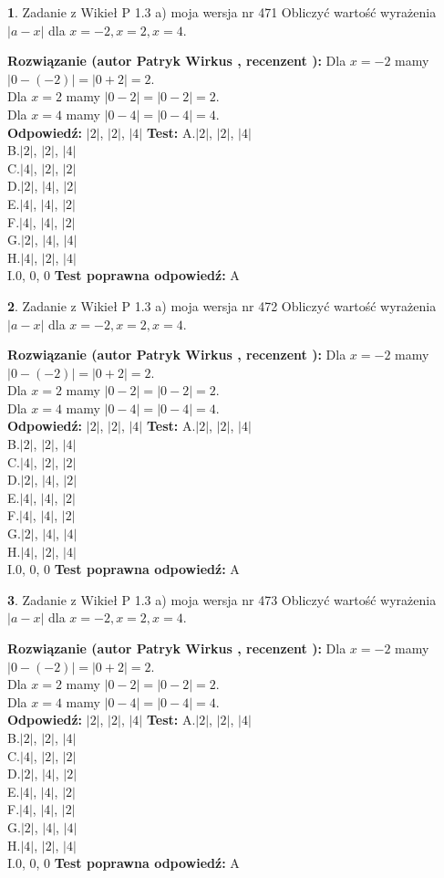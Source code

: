 \documentclass[12pt, a4paper]{article}
\theoremstyle{definition} %
\newtheorem{zad}{}
\newcommand{\zadStart}[1]{\begin{zad}#1\newline}
\newcommand{\zadStop}{\end{zad}}
\newcommand{\rozwStart}[2]{\noindent \textbf{Rozwiązanie (autor #1 , recenzent #2): }\newline}
\newcommand{\rozwStop}{\newline}
\newcommand{\odpStart}{\noindent \textbf{Odpowiedź:}\newline}
\newcommand{\odpStop}{\newline}
\newcommand{\testStart}{\noindent \textbf{Test:}\newline}
\newcommand{\testStop}{\newline}
\newcommand{\kluczStart}{\noindent \textbf{Test poprawna odpowiedź:}\newline}
\newcommand{\kluczStop}{\newline}
\begin{document}
\zadStart{Zadanie z Wikieł P 1.3 a) moja wersja nr 471}
Obliczyć wartość wyrażenia $|a - x|$ dla $x=-2,x=2,x=4$.
\zadStop
\rozwStart{Patryk Wirkus}{}
Dla $x = -2$ mamy $|0 - (-2)| = |0 + 2| = 2$.\\
Dla $x = 2$ mamy $|0 - 2| = |0 - 2| = 2$.\\
Dla $x = 4$ mamy $|0 - 4| = |0 - 4| = 4$.\\
\rozwStop
\odpStart
$|2|$, $|2|$, $|4|$
\odpStop
\testStart
A.$|2|$, $|2|$, $|4|$\\
B.$|2|$, $|2|$, $|4|$\\
C.$|4|$, $|2|$, $|2|$\\
D.$|2|$, $|4|$, $|2|$\\
E.$|4|$, $|4|$, $|2|$\\
F.$|4|$, $|4|$, $|2|$\\
G.$|2|$, $|4|$, $|4|$\\
H.$|4|$, $|2|$, $|4|$\\
I.$0$, $0$, $0$
\testStop
\kluczStart
A
\kluczStop



\zadStart{Zadanie z Wikieł P 1.3 a) moja wersja nr 472}
Obliczyć wartość wyrażenia $|a - x|$ dla $x=-2,x=2,x=4$.
\zadStop
\rozwStart{Patryk Wirkus}{}
Dla $x = -2$ mamy $|0 - (-2)| = |0 + 2| = 2$.\\
Dla $x = 2$ mamy $|0 - 2| = |0 - 2| = 2$.\\
Dla $x = 4$ mamy $|0 - 4| = |0 - 4| = 4$.\\
\rozwStop
\odpStart
$|2|$, $|2|$, $|4|$
\odpStop
\testStart
A.$|2|$, $|2|$, $|4|$\\
B.$|2|$, $|2|$, $|4|$\\
C.$|4|$, $|2|$, $|2|$\\
D.$|2|$, $|4|$, $|2|$\\
E.$|4|$, $|4|$, $|2|$\\
F.$|4|$, $|4|$, $|2|$\\
G.$|2|$, $|4|$, $|4|$\\
H.$|4|$, $|2|$, $|4|$\\
I.$0$, $0$, $0$
\testStop
\kluczStart
A
\kluczStop



\zadStart{Zadanie z Wikieł P 1.3 a) moja wersja nr 473}
Obliczyć wartość wyrażenia $|a - x|$ dla $x=-2,x=2,x=4$.
\zadStop
\rozwStart{Patryk Wirkus}{}
Dla $x = -2$ mamy $|0 - (-2)| = |0 + 2| = 2$.\\
Dla $x = 2$ mamy $|0 - 2| = |0 - 2| = 2$.\\
Dla $x = 4$ mamy $|0 - 4| = |0 - 4| = 4$.\\
\rozwStop
\odpStart
$|2|$, $|2|$, $|4|$
\odpStop
\testStart
A.$|2|$, $|2|$, $|4|$\\
B.$|2|$, $|2|$, $|4|$\\
C.$|4|$, $|2|$, $|2|$\\
D.$|2|$, $|4|$, $|2|$\\
E.$|4|$, $|4|$, $|2|$\\
F.$|4|$, $|4|$, $|2|$\\
G.$|2|$, $|4|$, $|4|$\\
H.$|4|$, $|2|$, $|4|$\\
I.$0$, $0$, $0$
\testStop
\kluczStart
A
\kluczStop
\end{document}
